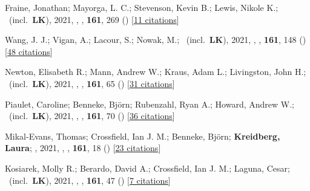 \item[{\color{numcolor}\scriptsize52}] Fraine, Jonathan; Mayorga, L. C.; Stevenson, Kevin B.; Lewis, Nikole K.; \etal\ (incl.\ \textbf{LK}), 2021, , \aj, \textbf{161}, 269 () [\href{https://ui.adsabs.harvard.edu/abs/2021AJ....161..269F}{11 citations}]

\item[{\color{numcolor}\scriptsize51}] Wang, J. J.; Vigan, A.; Lacour, S.; Nowak, M.; \etal\ (incl.\ \textbf{LK}), 2021, , \aj, \textbf{161}, 148 () [\href{https://ui.adsabs.harvard.edu/abs/2021AJ....161..148W}{48 citations}]

\item[{\color{numcolor}\scriptsize50}] Newton, Elisabeth R.; Mann, Andrew W.; Kraus, Adam L.; Livingston, John H.; \etal\ (incl.\ \textbf{LK}), 2021, , \aj, \textbf{161}, 65 () [\href{https://ui.adsabs.harvard.edu/abs/2021AJ....161...65N}{31 citations}]

\item[{\color{numcolor}\scriptsize49}] Piaulet, Caroline; Benneke, Bj{\"o}rn; Rubenzahl, Ryan A.; Howard, Andrew W.; \etal\ (incl.\ \textbf{LK}), 2021, , \aj, \textbf{161}, 70 () [\href{https://ui.adsabs.harvard.edu/abs/2021AJ....161...70P}{36 citations}]

\item[{\color{numcolor}\scriptsize48}] Mikal-Evans, Thomas; Crossfield, Ian J. M.; Benneke, Bj{\"o}rn; \textbf{Kreidberg, Laura}; \etal, 2021, , \aj, \textbf{161}, 18 () [\href{https://ui.adsabs.harvard.edu/abs/2021AJ....161...18M}{23 citations}]

\item[{\color{numcolor}\scriptsize47}] Kosiarek, Molly R.; Berardo, David A.; Crossfield, Ian J. M.; Laguna, Cesar; \etal\ (incl.\ \textbf{LK}), 2021, , \aj, \textbf{161}, 47 () [\href{https://ui.adsabs.harvard.edu/abs/2021AJ....161...47K}{7 citations}]

